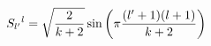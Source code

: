 \begin{equation}
 S_{l'}{}^l =
  \sqrt{{2 \over {k+2}}}
  \sin \left( \pi {{(l'+1)(l+1)} \over {k+2}} \right)
\end{equation}


